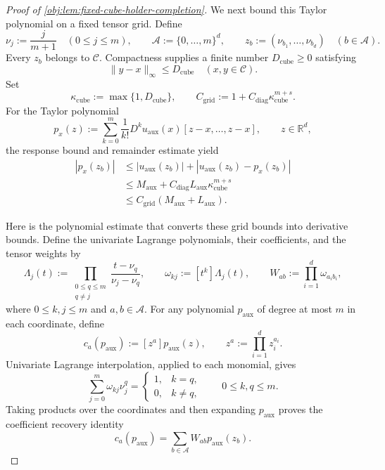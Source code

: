 \begin{proof}[Proof of \cref{obj:lem:fixed-cube-holder-completion}]
We next bound this Taylor polynomial on a fixed tensor grid. Define
\[
\nu_j:=\frac{j}{m+1}\quad(0\le j\le m),\qquad
\mathscr A:=\{0,\ldots,m\}^d,\qquad
z_b:=(\nu_{b_1},\ldots,\nu_{b_d})
\quad(b\in\mathscr A).
\]
Every \(z_b\) belongs to \(\mathscr C\). Compactness supplies a finite number \(D_{\mathrm{cube}}\ge0\) satisfying
\[
\|y-x\|_\infty\le D_{\mathrm{cube}}
\quad(x,y\in\mathscr C).
\]
Set
\[
\kappa_{\mathrm{cube}}:=\max\{1,D_{\mathrm{cube}}\},
\qquad
C_{\mathrm{grid}}
:=
1+C_{\mathrm{diag}}\kappa_{\mathrm{cube}}^{m+s}.
\]
For the Taylor polynomial
\[
p_x(z):=
\sum_{k=0}^{m}\frac{1}{k!}
D^k u_{\mathrm{aux}}(x)[z-x,\ldots,z-x],
\qquad z\in\mathbb R^d,
\]
the response bound and remainder estimate yield
\[
\begin{aligned}
|p_x(z_b)|
&\le |u_{\mathrm{aux}}(z_b)|
   +|u_{\mathrm{aux}}(z_b)-p_x(z_b)|\\
&\le M_{\mathrm{aux}}
   +C_{\mathrm{diag}}L_{\mathrm{aux}}
      \kappa_{\mathrm{cube}}^{m+s}\\
&\le C_{\mathrm{grid}}
      (M_{\mathrm{aux}}+L_{\mathrm{aux}}).
\end{aligned}
\]

Here is the polynomial estimate that converts these grid bounds into derivative bounds. Define the univariate Lagrange polynomials, their coefficients, and the tensor weights by
\[
\Lambda_j(t):=
\prod_{\substack{0\le q\le m\\q\ne j}}
\frac{t-\nu_q}{\nu_j-\nu_q},
\qquad
\omega_{kj}:=[t^k]\Lambda_j(t),
\qquad
W_{ab}:=\prod_{i=1}^d\omega_{a_i b_i},
\]
where \(0\le k,j\le m\) and \(a,b\in\mathscr A\).
For any polynomial \(p_{\mathrm{aux}}\) of degree at most \(m\) in each coordinate, define
\[
c_a(p_{\mathrm{aux}}):=[z^a]p_{\mathrm{aux}}(z),
\qquad
z^a:=\prod_{i=1}^d z_i^{a_i}.
\]
Univariate Lagrange interpolation, applied to each monomial, gives
\[
\sum_{j=0}^m\omega_{kj}\nu_j^q
=
\begin{cases}
1,&k=q,\\
0,&k\ne q,
\end{cases}
\qquad 0\le k,q\le m.
\]
Taking products over the coordinates and then expanding \(p_{\mathrm{aux}}\) proves the coefficient recovery identity
\[
c_a(p_{\mathrm{aux}})
=
\sum_{b\in\mathscr A}W_{ab}p_{\mathrm{aux}}(z_b).
\]


\end{proof}
